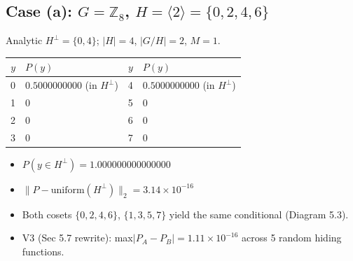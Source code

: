 \documentclass[11pt]{article}
\begin{document}
\subsection{Case (a): $G = \mathbb{Z}_8$, $H = \langle 2\rangle = \{0,2,4,6\}$}
Analytic $H^\perp = \{0, 4\}$; $|H|=4$, $|G/H|=2$, $M=1$.
\begin{center}
\begin{tabular}{rlrl}
\toprule
$y$ & $P(y)$ & $y$ & $P(y)$ \\
\midrule
0 & $0.5000000000$ (in $H^\perp$) & 4 & $0.5000000000$ (in $H^\perp$) \\
1 & $0$                            & 5 & $0$ \\
2 & $0$                            & 6 & $0$ \\
3 & $0$                            & 7 & $0$ \\
\bottomrule
\end{tabular}
\end{center}
\begin{itemize}
\item $P(y \in H^\perp) = 1.000000000000000$
\item $\|P - \mathrm{uniform}(H^\perp)\|_2 = 3.14 \times 10^{-16}$
\item Both cosets $\{0,2,4,6\}$, $\{1,3,5,7\}$ yield the same conditional (Diagram 5.3).
\item V3 (Sec 5.7 rewrite): max$|P_A - P_B| = 1.11 \times 10^{-16}$ across 5 random hiding functions.
\end{itemize}
\end{document}
